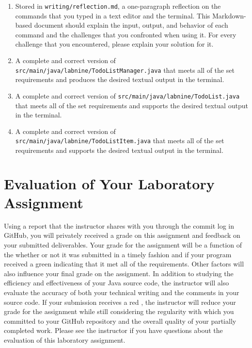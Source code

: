 \documentclass[11pt]{article}
\newcommand{\mainprogramsource}{\lstinline{src/main/java/labnine/TodoListManager.java}}
\newcommand{\secondprogramsource}{\lstinline{src/main/java/labnine/TodoList.java}}
\newcommand{\thirdprogramsource}{\lstinline{src/main/java/labnine/TodoListItem.java}}
\newcommand{\reflection}{\lstinline{writing/reflection.md}}
\newcommand{\checkmark}{\ding{51}}
\newcommand{\naughtmark}{\ding{55}}
\begin{document}
\begin{enumerate}

  \setlength{\itemsep}{0in}

\item Stored in \reflection{}, a one-paragraph reflection on the commands that
  you typed in a text editor and the terminal. This Markdown-based document
  should explain the input, output, and behavior of each command and the
  challenges that you confronted when using it. For every challenge that you
  encountered, please explain your solution for it.

\item A complete and correct version of \mainprogramsource{} that meets all of
  the set requirements and produces the desired textual output in the terminal.

\item A complete and correct version of \secondprogramsource{} that meets all of
  the set requirements and supports the desired textual output in the terminal.

\item A complete and correct version of \thirdprogramsource{} that meets all of
  the set requirements and supports the desired textual output in the terminal.


\end{enumerate}

\section*{Evaluation of Your Laboratory Assignment}

Using a report that the instructor shares with you through the commit log in
GitHub, you will privately received a grade on this assignment and feedback on
your submitted deliverables. Your grade for the assignment will be a function of
the whether or not it was submitted in a timely fashion and if your program
received a green \checkmark{} indicating that it met all of the requirements.
Other factors will also influence your final grade on the assignment. In
addition to studying the efficiency and effectiveness of your Java source code,
the instructor will also evaluate the accuracy of both your technical writing
and the comments in your source code. If your submission receives a red
\naughtmark{}, the instructor will reduce your grade for the assignment while
still considering the regularity with which you committed to your GitHub
repository and the overall quality of your partially completed work. Please see
the instructor if you have questions about the evaluation of this laboratory
assignment.
\end{document}
